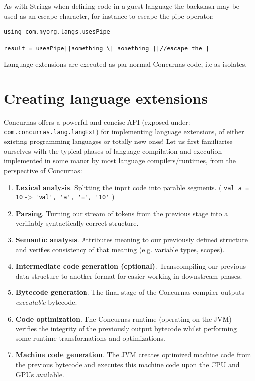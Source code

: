 \documentclass[conc-doc]{subfiles}
\begin{document}
As with Strings when defining code in a guest language the backslash may be used as an escape character, for instance to escape the pipe operator:

\begin{lstlisting}
using com.myorg.langs.usesPipe

result = usesPipe||something \| something ||//escape the |
\end{lstlisting}

Language extensions are executed as par normal Concurnas code, i.e as isolates. 





\section{Creating language extensions}
Concurnas offers a powerful and concise API (exposed under: \lstinline{com.concurnas.lang.langExt}) for implementing language extensions, of either existing programming languages or totally new ones! Let us first familiarise ourselves with the typical phases of language compilation and execution implemented in some manor by most language compilers/runtimes, from the perspective of Concurnas:

\begin{enumerate}
	\item \textbf{Lexical analysis}. Splitting the input code into parable segments. ( \lstinline{val a = 10} -> \lstinline{'val', 'a', '=', '10'} )
	\item \textbf{Parsing}. Turning our stream of tokens from the previous stage into a verifiably syntactically correct structure.
	\item \textbf{Semantic analysis}. Attributes meaning to our previously defined structure and verifies consistency of that meaning (e.g. variable types, scopes).
	\item \textbf{Intermediate code generation (optional)}. Transcompiling our previous data structure to another format for easier working in downstream phases.
	\item \textbf{Bytecode generation}. The final stage of the Concurnas compiler outputs \textit{executable} bytecode.
	\item \textbf{Code optimization}. The Concurnas runtime (operating on the JVM) verifies the integrity of the previously output bytecode whilst performing some runtime transformations and optimizations.
	\item \textbf{Machine code generation}. The JVM creates optimized machine code from the previous bytecode and executes this machine code upon the CPU and GPUs available.
\end{enumerate}
\end{document}
